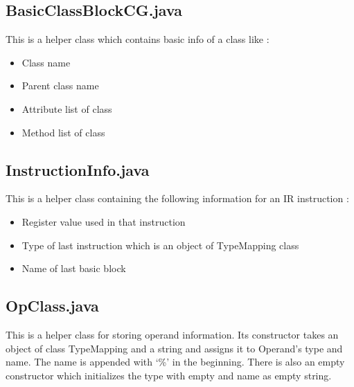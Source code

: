 \documentclass{article}
\begin{document}
\subsection{BasicClassBlockCG.java}
This is a helper class which contains basic info of a class like :
\begin{itemize}

    \item Class name
    \item Parent class name
    \item Attribute list of class
    \item Method list of class

\end{itemize}


\subsection{InstructionInfo.java}
This is a helper class containing the following information for an IR instruction :
\begin{itemize}

    \item Register value used in that instruction
    \item Type of last instruction which is an object of TypeMapping class
    \item Name of last basic block

\end{itemize} 

\subsection{OpClass.java}
This is a helper class for storing operand information. Its constructor takes an object of class TypeMapping and a string and assigns it to Operand's type and name. The name is appended with ‘\%’ in the beginning. There is also an empty constructor which initializes the type with empty and name as empty string.
\end{document}
